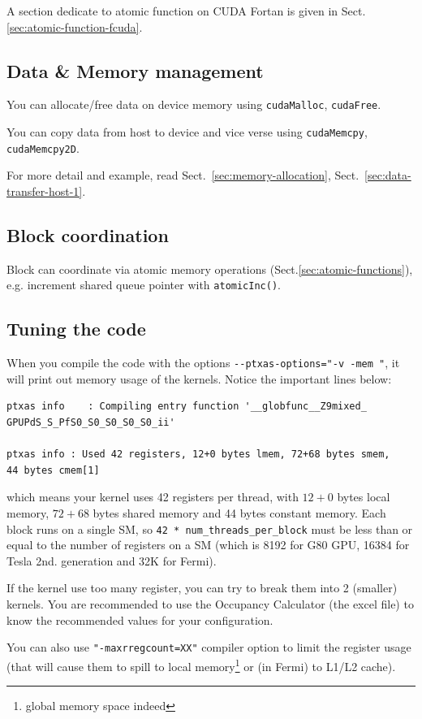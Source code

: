 A section dedicate to atomic function on CUDA Fortan is given in
Sect.\ref{sec:atomic-function-fcuda}.

\subsection{Data \& Memory management}
\label{sec:data--memory}

You can allocate/free data on device memory using \verb!cudaMalloc!,
\verb!cudaFree!.

You can copy data from host to device and vice verse using
\verb!cudaMemcpy!, \verb!cudaMemcpy2D!.

For more detail and example, read Sect.~\ref{sec:memory-allocation},
Sect.~\ref{sec:data-transfer-host-1}.
\subsection{Block coordination}
\label{sec:block-coordination}

Block can coordinate via atomic memory operations
(Sect.\ref{sec:atomic-functions}), e.g.
increment shared queue pointer with \verb!atomicInc()!.

\subsection{Tuning the code}
\label{sec:tuning-code}

When you compile the code with the options
\verb!--ptxas-options="-v -mem "!, it will print out memory usage of
the kernels. Notice the important lines below:
\begin{verbatim}
ptxas info    : Compiling entry function '__globfunc__Z9mixed_
GPUPdS_S_PfS0_S0_S0_S0_S0_ii'

ptxas info : Used 42 registers, 12+0 bytes lmem, 72+68 bytes smem, 
44 bytes cmem[1]
\end{verbatim}
which means your kernel uses 42 registers per thread, with $12+0$
bytes local memory, $72+68$ bytes shared memory and 44 bytes constant
memory. Each block runs on a single SM, so
\verb!42 * num_threads_per_block! must be less than or equal to the
number of registers on a SM (which is 8192 for G80 GPU, 16384 for Tesla
2nd. generation and 32K for Fermi). 

\begin{framed}
  If the kernel use too many register, you can try to break them into
2 (smaller) kernels. You are recommended to use the Occupancy
Calculator (the excel file) to know the recommended values for your
configuration.

\end{framed}
You can also use \verb!"-maxrregcount=XX"! compiler option to limit
the register usage (that will cause them to spill to local
memory\footnote{global memory space indeed} or (in Fermi) to L1/L2
cache).

